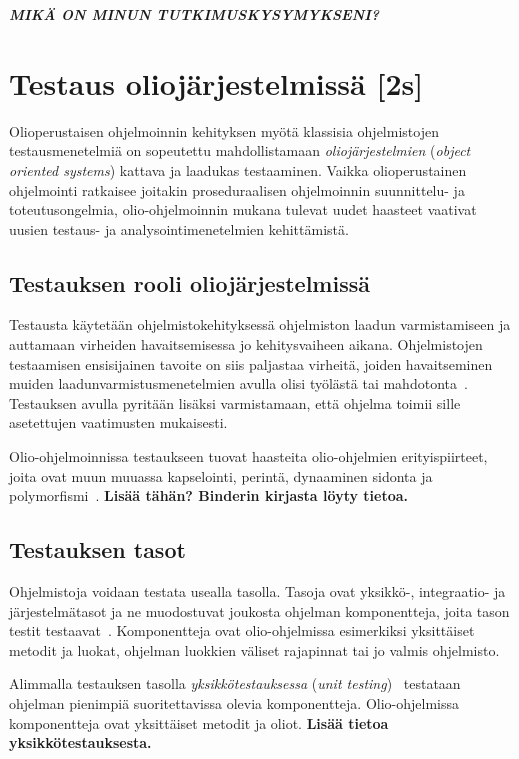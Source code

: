\documentclass[finnish, grading]{tktltiki2}
\theoremstyle{definition}
\theoremstyle{remark}
\begin{document}
\textbf{\textit{MIKÄ ON MINUN TUTKIMUSKYSYMYKSENI?}}


\section{Testaus oliojärjestelmissä [2s]}

Olioperustaisen ohjelmoinnin kehityksen myötä klassisia ohjelmistojen testausmenetelmiä on sopeutettu mahdollistamaan \textit{oliojärjestelmien} (\textit{object oriented systems}) kattava ja laadukas testaaminen. Vaikka olioperustainen ohjelmointi ratkaisee joitakin proseduraalisen ohjelmoinnin suunnittelu- ja toteutusongelmia, olio-ohjelmoinnin mukana tulevat uudet haasteet vaativat uusien testaus- ja analysointimenetelmien kehittämistä. 

\subsection{Testauksen rooli oliojärjestelmissä}

Testausta käytetään ohjelmistokehityksessä ohjelmiston laadun varmistamiseen ja auttamaan virheiden havaitsemisessa jo kehitysvaiheen aikana. Ohjelmistojen testaamisen ensisijainen tavoite on siis paljastaa virheitä, joiden havaitseminen muiden laadunvarmistusmenetelmien avulla olisi työlästä tai mahdotonta~\cite[s. 59]{Binder:1999}. Testauksen avulla pyritään lisäksi varmistamaan, että ohjelma toimii sille asetettujen vaatimusten mukaisesti. 

Olio-ohjelmoinnissa testaukseen tuovat haasteita olio-ohjelmien erityispiirteet, joita ovat muun muuassa kapselointi, perintä, dynaaminen sidonta ja polymorfismi~\cite[s. 86]{Mariani:Pezze:2008}. \textbf{Lisää tähän? Binderin kirjasta löyty tietoa.}


\subsection{Testauksen tasot}

Ohjelmistoja voidaan testata usealla tasolla. Tasoja ovat yksikkö-, integraatio- ja järjestelmätasot ja ne muodostuvat joukosta ohjelman komponentteja, joita tason testit testaavat~\cite[s. 45]{Binder:1999}. Komponentteja ovat olio-ohjelmissa esimerkiksi yksittäiset metodit ja luokat, ohjelman luokkien väliset rajapinnat tai jo valmis ohjelmisto.

Alimmalla testauksen tasolla \textit{yksikkötestauksessa} (\textit{unit testing})~\cite[s. 45]{Binder:1999} testataan ohjelman pienimpiä suoritettavissa olevia komponentteja. Olio-ohjelmissa komponentteja ovat yksittäiset metodit ja oliot. \textbf{Lisää tietoa yksikkötestauksesta.}
\end{document}
